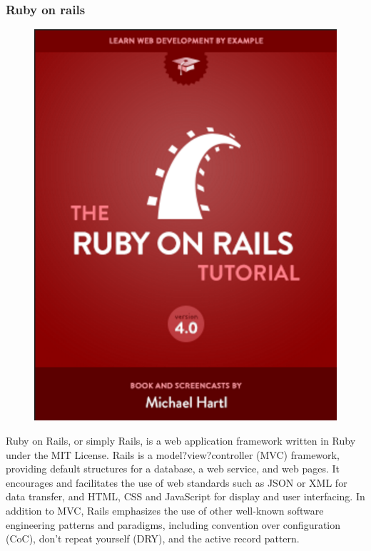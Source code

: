 \documentclass[conference]{IEEEtran}
\begin{document}
\subsubsection{Ruby on rails}
\begin{figure}[H]
\begin{center}
    \includegraphics[scale=0.5]{ruby}
    \label{fig:label}
\end{center}
\end{figure}
Ruby on Rails, or simply Rails, is a web application framework written in Ruby under the MIT License. Rails is a model?view?controller (MVC) framework, providing default structures for a database, a web service, and web pages. It encourages and facilitates the use of web standards such as JSON or XML for data transfer, and HTML, CSS and JavaScript for display and user interfacing. In addition to MVC, Rails emphasizes the use of other well-known software engineering patterns and paradigms, including convention over configuration (CoC), don't repeat yourself (DRY), and the active record pattern.
\end{document}

